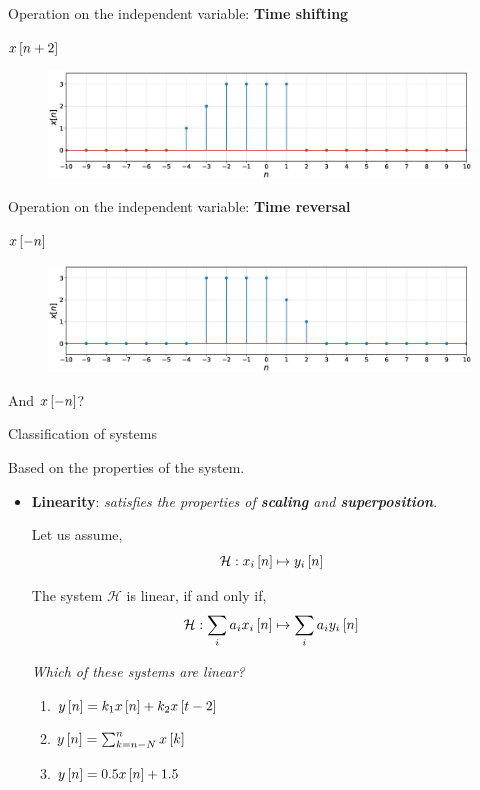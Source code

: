\documentclass[aspectratio=169]{beamer}
\let\olditem\item
\renewcommand{\item}{\setlength{\itemsep}{\fill}\olditem}
\def\ls{\ensuremath\left[}
\def\rs{\ensuremath\right]}
\begin{document}
\begin{frame}{Operation on the independent variable: \textbf{Time shifting}}

$x\ls n + 2 \rs$ 

\begin{figure}
\includegraphics[width=\textwidth]{img/discsig-shift2.eps}
\end{figure}

\end{frame}

\begin{frame}{Operation on the independent variable: \textbf{Time reversal}}

$x\ls -n \rs$ 

\begin{figure}
\includegraphics[width=\textwidth]{img/discsig-inv.eps}
\end{figure}

And $x\ls -n\rs$?

\end{frame}


\begin{frame}{Classification of systems}

Based on the properties of the system.

\begin{itemize}
\item \textbf{Linearity}: \textit{satisfies the properties of \textbf{scaling} and \textbf{superposition}}.

Let us assume, 
\[ \mathcal{H}: x_i\ls n \rs \mapsto y_i\ls n \rs \]

The system $\mathcal{H}$ is linear, if and only if,
\[ \mathcal{H}:\sum_ia_ix_i\ls n \rs \mapsto \sum_ia_iy_i\ls n \rs \]

\textit{Which of these systems are linear?}
\begin{enumerate}
\item $y\ls n \rs = k_1x\ls n \rs + k_2x\ls t-2 \rs$
\item $y\ls n \rs = \sum_{k=n-N}^{n}x \ls k \rs $
\item $y\ls n \rs = 0.5x\ls n \rs + 1.5$
\end{enumerate}
\end{itemize}
\end{frame}
\end{document}
